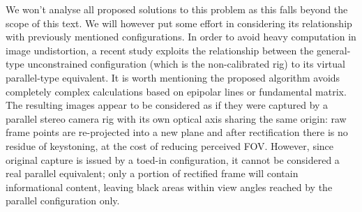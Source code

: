 We won't analyse all proposed solutions to this problem as this falls beyond the scope of this text. We will however put some effort in considering its relationship with previously mentioned configurations. In order to avoid heavy computation in image undistortion, a recent study \cite{stereo_rectify_parallelise} exploits the relationship between the general-type unconstrained configuration (which is the non-calibrated rig) to its virtual parallel-type equivalent. It is worth mentioning the proposed algorithm avoids completely complex calculations based on epipolar lines or fundamental matrix. The resulting images appear to be considered as if they were captured by a parallel stereo camera rig with its own optical axis sharing the same origin: raw frame points are re-projected into a new plane and after rectification there is no residue of keystoning, at the cost of reducing perceived FOV. However, since original capture is issued by a toed-in configuration, it cannot be considered a real parallel equivalent; only a portion of rectified frame will contain informational content, leaving black areas within view angles reached by the parallel configuration only.

